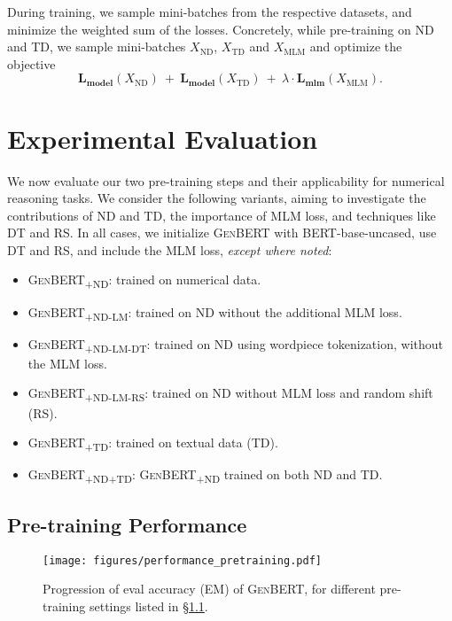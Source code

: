 \documentclass[11pt,a4paper]{article}
\newcommand\ssc[1]{\textsubscript{\textsc{#1}}}
\newcommand\bert{\textsc{BERT}}
\newcommand\genbert{\textsc{GenBERT}}
\begin{document}
During training, we sample mini-batches from the respective datasets, and minimize the weighted sum of the losses. Concretely, while pre-training on ND and TD, we sample mini-batches $X_{\text{ND}}$, $X_{\text{TD}}$ and $X_{\text{MLM}}$ and optimize the objective 
\[
\mathbf{L_{\text{model}}}(X_{\text{ND}})\ +\ \mathbf{L_{\text{model}}}(X_{\text{TD}})\ + \ \lambda\cdot \mathbf{L_{\text{mlm}}}(X_{\text{MLM}}).
\]




%
 \section{Experimental Evaluation}

We now evaluate our two pre-training steps and their applicability for numerical reasoning tasks. 
We consider the following variants, aiming to investigate the contributions of ND and TD, the importance of MLM loss, and techniques like DT and RS. In all cases, we initialize \genbert{} with \bert{}-base-uncased, use DT and RS, and include the MLM loss, \textit{except where noted}:
\begin{itemize}[topsep=0pt, itemsep=1pt, leftmargin=.1in, parsep=2pt]
    \item \textsc{GenBERT\ssc{+ND}}: trained on numerical data.
    \item \textsc{GenBERT\ssc{+ND-LM}}: trained on ND without the additional MLM loss.
    \item \textsc{GenBERT\ssc{+ND-LM-DT}}: trained on ND using wordpiece tokenization, without the MLM loss.
    \item \textsc{GenBERT\ssc{+ND-LM-RS}}: trained on ND without MLM loss and random shift (RS).
    \item \textsc{GenBERT\ssc{+TD}}: trained on textual data (TD). 
    \item \textsc{GenBERT\ssc{+ND+TD}}: \textsc{GenBERT\ssc{+ND}} trained on both ND and TD.
\end{itemize}


\subsection{Pre-training Performance}
 \label{section:pretraining_results}
 
\begin{figure}
\setlength{\belowcaptionskip}{-15pt}
    \centering
    \texttt{[image: figures/performance\_pretraining.pdf]}
    \caption{Progression of eval accuracy (EM) of \genbert{}, for different pre-training settings listed in \S\ref{section:pretraining_results}.}
    \label{figure:performance_pretraining}
\end{figure}
\end{document}
